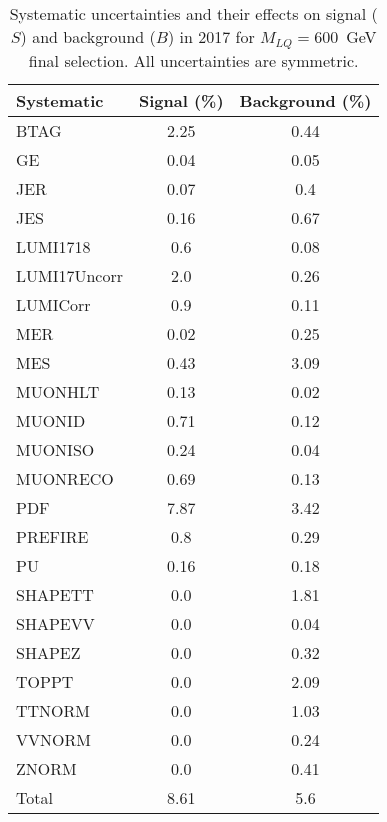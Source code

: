 \begin{table}[htbp]
\begin{center}
\caption{Systematic uncertainties and their effects on signal ($S$) and background ($B$) in 2017 for $M_{LQ}=600$~GeV final selection. All uncertainties are symmetric.}
\begin{tabular}{lcc}
\hline\hline
Systematic & Signal (\%) & Background (\%) \\ \hline 
BTAG & 2.25 & 0.44\\ 
GE & 0.04 & 0.05\\ 
JER & 0.07 & 0.4\\ 
JES & 0.16 & 0.67\\ 
LUMI1718 & 0.6 & 0.08\\ 
LUMI17Uncorr & 2.0 & 0.26\\ 
LUMICorr & 0.9 & 0.11\\ 
MER & 0.02 & 0.25\\ 
MES & 0.43 & 3.09\\ 
MUONHLT & 0.13 & 0.02\\ 
MUONID & 0.71 & 0.12\\ 
MUONISO & 0.24 & 0.04\\ 
MUONRECO & 0.69 & 0.13\\ 
PDF & 7.87 & 3.42\\ 
PREFIRE & 0.8 & 0.29\\ 
PU & 0.16 & 0.18\\ 
SHAPETT & 0.0 & 1.81\\ 
SHAPEVV & 0.0 & 0.04\\ 
SHAPEZ & 0.0 & 0.32\\ 
TOPPT & 0.0 & 2.09\\ 
TTNORM & 0.0 & 1.03\\ 
VVNORM & 0.0 & 0.24\\ 
ZNORM & 0.0 & 0.41\\ 
Total & 8.61 & 5.6\\ \hline \hline
\end{tabular}
\label{tab:SysUncertainties_uujj_600}
\end{center}
\end{table}

